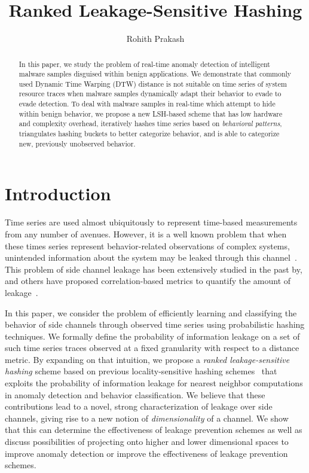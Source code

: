 \documentclass[a4paper]{article}
\title{Ranked Leakage-Sensitive Hashing}
\author{Rohith Prakash}
\date{}
\begin{document}
\maketitle{}

\begin{abstract}
    In this paper, we study the problem of real-time anomaly detection of intelligent malware samples disguised within benign applications. 
    We demonstrate that commonly used Dynamic Time Warping (DTW) distance is not suitable on time series of system resource traces when malware samples dynamically adapt their behavior to evade to evade detection.
    To deal with malware samples in real-time which attempt to hide within benign behavior, we propose a new LSH-based scheme that has low hardware and complexity overhead, iteratively hashes time series based on \textit{behavioral patterns}, triangulates hashing buckets to better categorize behavior, and is able to categorize new, previously unobserved behavior.
\end{abstract}

\section{Introduction}
\label{sec:intro}

Time series are used almost ubiquitously to represent time-based measurements from any number of avenues.
However, it is a well known problem that when these times series represent behavior-related observations of complex systems, unintended information about the system may be leaked through this channel~\cite{DBLP:conf/ccs/RistenpartTSS09,DBLP:conf/sp/ZhangJOR11}.
This problem of side channel leakage has been extensively studied in the past by, and others have proposed correlation-based metrics to quantify the amount of leakage~\cite{demme2012,zhang2013}.

In this paper, we consider the problem of efficiently learning and classifying the behavior of side channels through observed time series using probabilistic hashing techniques.
We formally define the probability of information leakage on a set of such time series traces observed at a fixed granularity with respect to a distance metric.
By expanding on that intuition, we propose a \textit{ranked leakage-sensitive hashing} scheme based on previous locality-sensitive hashing schemes~\cite{Kulis12-KLSH,Jiang15-KLSH,Kim16-SLSH} that exploits the probability of information leakage for nearest neighbor computations in anomaly detection and behavior classification.
We believe that these contributions lead to a novel, strong characterization of leakage over side channels, giving rise to a new notion of \textit{dimensionality} of a channel.
We show that this can determine the effectiveness of leakage prevention schemes as well as discuss possibilities of projecting onto higher and lower dimensional spaces to improve anomaly detection or improve the effectiveness of leakage prevention schemes.
\end{document}
